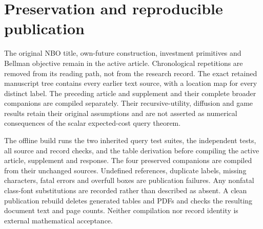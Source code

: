 \section{Preservation and reproducible publication}\label{supp:preservation65}
The original NBO title, own-future construction, investment primitives and Bellman objective remain in the active article. Chronological repetitions are removed from its reading path, not from the research record. The exact retained manuscript tree contains every earlier text source, with a location map for every distinct label. The preceding article and supplement and their complete broader companions are compiled separately. Their recursive-utility, diffusion and game results retain their original assumptions and are not asserted as numerical consequences of the scalar expected-cost query theorem.

The offline build runs the two inherited query test suites, the independent tests, all source and record checks, and the table derivation before compiling the active article, supplement and response. The four preserved companions are compiled from their unchanged sources. Undefined references, duplicate labels, missing characters, fatal errors and overfull boxes are publication failures. Any nonfatal class-font substitutions are recorded rather than described as absent. A clean publication rebuild deletes generated tables and PDFs and checks the resulting document text and page counts. Neither compilation nor record identity is external mathematical acceptance.

